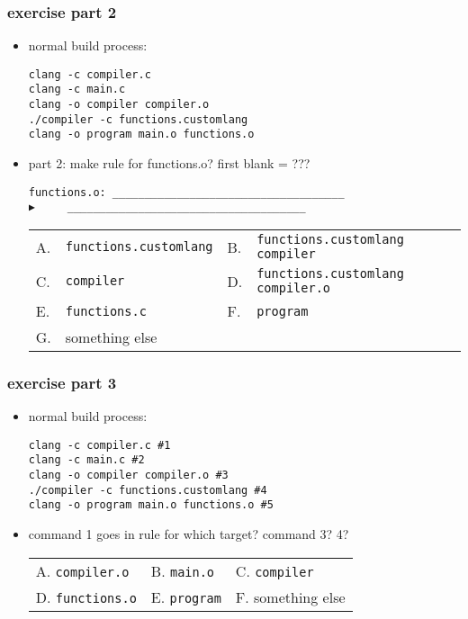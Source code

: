 \begin{FragileFrame}
\frametitle{exercise part 2}
    \begin{itemize}
    \item normal build process:
\begin{Verbatim}[frame=single,fontsize=\fontsize{10}{11}]
clang -c compiler.c
clang -c main.c
clang -o compiler compiler.o
./compiler -c functions.customlang
clang -o program main.o functions.o
\end{Verbatim}
    \item part 2: make rule for functions.o? first blank = ???
\begin{Verbatim}[frame=single,fontsize=\fontsize{11}{12}]
functions.o: ____________________________________
▶     _____________________________________
\end{Verbatim}
\begin{tabular}{llll}
A. & \texttt{functions.customlang} & B. & \texttt{functions.customlang compiler} \\
C. & \texttt{compiler} & D. & \texttt{functions.customlang compiler.o} \\
E. & \texttt{functions.c} & F. & \texttt{program} \\
G. & something else\\
\end{tabular}
    \end{itemize}
\end{FragileFrame}

\begin{FragileFrame}
\frametitle{exercise part 3}
    \begin{itemize}
    \item normal build process:
\begin{Verbatim}[frame=single,fontsize=\fontsize{10}{11}]
clang -c compiler.c #1
clang -c main.c #2
clang -o compiler compiler.o #3
./compiler -c functions.customlang #4
clang -o program main.o functions.o #5
\end{Verbatim}
    \item command 1 goes in rule for which target? command 3? 4?
\begin{tabular}{lll}
    A. \texttt{compiler.o} & B. \texttt{main.o} & C. \texttt{compiler} \\
    D. \texttt{functions.o} & E. \texttt{program} & F. something else \\
\end{tabular}
    \end{itemize}
\end{FragileFrame}

